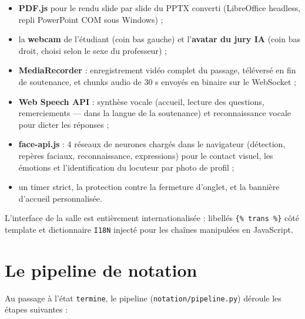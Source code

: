 \documentclass[12pt,a4paper]{report}
\begin{document}
\begin{itemize}
  \item \textbf{PDF.js} pour le rendu slide par slide du PPTX converti
        (LibreOffice headless, repli PowerPoint COM sous Windows) ;
  \item la \textbf{webcam} de l'étudiant (coin bas gauche) et l'\textbf{avatar
        du jury IA} (coin bas droit, choisi selon le sexe du professeur) ;
  \item \textbf{MediaRecorder} : enregistrement vidéo complet du passage,
        téléversé en fin de soutenance, et chunks audio de 30 s envoyés en
        binaire sur le WebSocket ;
  \item \textbf{Web Speech API} : synthèse vocale (accueil, lecture des
        questions, remerciements --- dans la langue de la soutenance) et
        reconnaissance vocale pour dicter les réponses ;
  \item \textbf{face-api.js} : 4 réseaux de neurones chargés dans le
        navigateur (détection, repères faciaux, reconnaissance, expressions)
        pour le contact visuel, les émotions et l'identification du locuteur
        par photo de profil ;
  \item un timer strict, la protection contre la fermeture d'onglet, et la
        bannière d'accueil personnalisée.
\end{itemize}

L'interface de la salle est entièrement internationalisée : libellés
\texttt{\{\% trans \%\}} côté template et dictionnaire \texttt{I18N} injecté
pour les chaînes manipulées en JavaScript.

\section{Le pipeline de notation}

Au passage à l'état \texttt{termine}, le pipeline (\texttt{notation/pipeline.py})
déroule les étapes suivantes :
\end{document}
